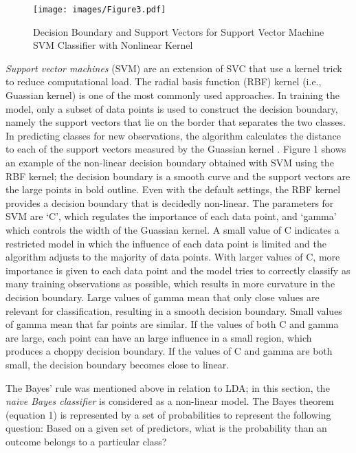 \documentclass[sigconf]{acmart}
\begin{document}
\begin{figure}[!ht]
  \centering\texttt{[image: images/Figure3.pdf]}
  \caption{Decision Boundary and Support Vectors for Support Vector Machine 
  SVM Classifier with Nonlinear Kernel \cite{muller17}}
  \label{f:Figure3}
\end{figure}

\emph{Support vector machines} (SVM) are an extension of SVC that use a 
kernel trick to reduce computational load. The radial basis function (RBF) 
kernel (i.e., Guassian kernel) is one of the most commonly used approaches. 
In training the model, only a subset of data points is used to construct the 
decision boundary, namely the support vectors that lie on the border that 
separates the two classes. In predicting classes for new observations, the 
algorithm calculates the distance to each of the support vectors measured 
by the Guassian kernel \cite{muller17}. Figure 1 shows an example of the 
non-linear decision boundary obtained with SVM using the RBF kernel; the 
decision boundary is a smooth curve and the support vectors are the large 
points in bold outline. Even with the default settings, the RBF kernel 
provides a decision boundary that is decidedly non-linear. The parameters 
for SVM are `C', which regulates the importance of each data point, and 
`gamma' which controls the width of the Guassian kernel. A small value of 
C indicates a restricted model in which the influence of each data point is 
limited and the algorithm adjusts to the majority of data points. With larger 
values of C, more importance is given to each data point and the model tries 
to correctly classify as many training observations as possible, which results 
in more curvature in the decision boundary. Large values of gamma mean that 
only close values are relevant for classification, resulting in a smooth 
decision boundary. Small values of gamma mean that far points are similar. 
If the values of both C and gamma are large, each point can have an large 
influence in a small region, which produces a choppy decision boundary. 
If the values of C and gamma are both small, the decision boundary becomes 
close to linear.


The Bayes' rule was mentioned above in relation to LDA; in this section, the 
\emph{naive Bayes classifier} is considered as a non-linear model.
The Bayes theorem (equation 1) is represented by a set of probabilities to 
represent the following question: Based on a given set of predictors, what
is the probability than an outcome belongs to a particular class?
\end{document}

